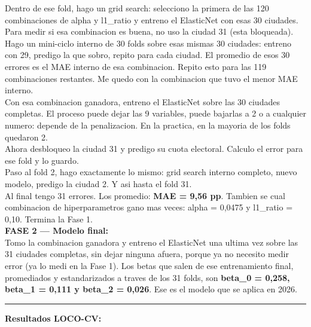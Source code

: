 \documentclass[11pt,a4paper]{article}
\begin{document}
{Dentro de ese fold, hago un grid search: selecciono la primera de las 120 combinaciones de alpha y l1_ratio y entreno el ElasticNet con esas 30 ciudades. Para medir si esa combinacion es buena, no uso la ciudad 31 (esta bloqueada). Hago un mini-ciclo interno de 30 folds sobre esas mismas 30 ciudades: entreno con 29, predigo la que sobro, repito para cada ciudad. El promedio de esos 30 errores es el MAE interno de esa combinacion. Repito esto para las 119 combinaciones restantes. Me quedo con la combinacion que tuvo el menor MAE interno.\\[2pt]

Con esa combinacion ganadora, entreno el ElasticNet sobre las 30 ciudades completas. El proceso puede dejar las 9 variables, puede bajarlas a 2 o a cualquier numero: depende de la penalizacion. En la practica, en la mayoria de los folds quedaron 2.\\[2pt]

Ahora desbloqueo la ciudad 31 y predigo su cuota electoral. Calculo el error para ese fold y lo guardo.\\[2pt]

Paso al fold 2, hago exactamente lo mismo: grid search interno completo, nuevo modelo, predigo la ciudad 2. Y asi hasta el fold 31.\\[2pt]

Al final tengo 31 errores. Los promedio: \textbf{MAE = 9,56 pp}. Tambien se cual combinacion de hiperparametros gano mas veces: alpha = 0,0475 y l1_ratio = 0,10. Termina la Fase 1.\\[2pt]

\textbf{FASE 2 — Modelo final:}\\[2pt]

Tomo la combinacion ganadora y entreno el ElasticNet una ultima vez sobre las 31 ciudades completas, sin dejar ninguna afuera, porque ya no necesito medir error (ya lo medi en la Fase 1). Los betas que salen de ese entrenamiento final, promediados y estandarizados a traves de los 31 folds, son \textbf{beta_0 = 0,258, beta_1 = 0,111 y beta_2 = 0,026}. Ese es el modelo que se aplica en 2026.\\[2pt]

\vspace{4pt}\noindent\rule{\linewidth}{0.4pt}\vspace{4pt}

\textbf{Resultados LOCO-CV:}\\[2pt]

}
\end{document}
